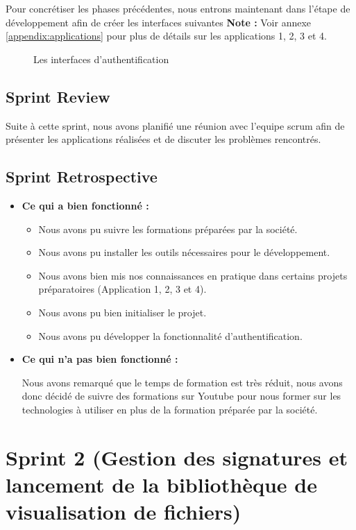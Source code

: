 Pour concrétiser les phases précédentes, nous entrons maintenant dans l'étape de développement afin de créer les interfaces suivantes
\textbf{Note :} Voir annexe \ref{appendix:applications} pour plus de détails sur les applications 1, 2, 3 et 4.


\begin{figure}[H]
  \centering
  \caption{Les interfaces d'authentification}
  \label{fig:realision_auth}
\end{figure}


\subsection{Sprint Review}
Suite à cette sprint, nous avons planifié une réunion avec l'equipe scrum afin de présenter les applications réalisées et de discuter les problèmes rencontrés.

\subsection{Sprint Retrospective}

\begin{itemize}
  \item \textbf{Ce qui a bien fonctionné :}
  \begin{itemize}
    \item Nous avons pu suivre les formations préparées par la société.
    \item Nous avons pu installer les outils nécessaires pour le développement.
    \item Nous avons bien mis nos connaissances en pratique dans certains projets préparatoires (Application 1, 2, 3 et 4).
    \item Nous avons pu bien initialiser le projet.
    \item Nous avons pu développer la fonctionnalité d'authentification.
  \end{itemize}
  \item \textbf{Ce qui n'a pas bien fonctionné :}
  
  Nous avons remarqué que le temps de formation est très réduit, nous avons donc décidé de suivre des formations sur Youtube pour nous former sur les technologies à utiliser en plus de la formation préparée par la société.
\end{itemize}

\section{Sprint 2 (Gestion des signatures et lancement de la bibliothèque de visualisation de fichiers)}

